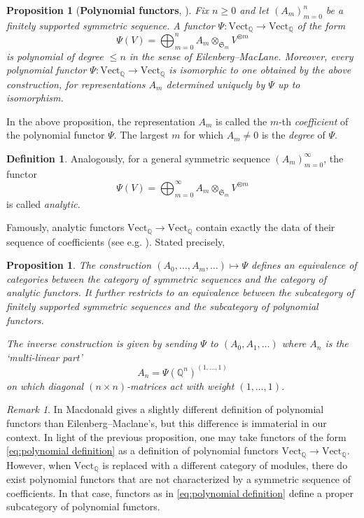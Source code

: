 \documentclass[12pt]{article}
\newcommand{\Q}{\mathbb{Q}}
\newcommand{\SymGroup}[1][n]{\mathfrak{S}_{#1}}
\newcommand{\Vect}[1]{\textrm{Vect}_{#1}}
\DeclareMathOperator{\GL}{GL}
\theoremstyle{plain}
\newtheorem{prop}[thm]{Proposition}
\theoremstyle{definition}
\newtheorem{defi}[thm]{Definition}
\theoremstyle{remark}
\newtheorem{rmk}[thm]{Remark}
\begin{document}
\begin{prop}[\textbf{Polynomial functors}{, \cite[Appendix I.A]{MacDonald}}]\label{prop:polynomiality-Qmod}
    Fix $n\geq 0$ and let $(A_m)_{m=0}^n$ be a finitely supported symmetric sequence. A functor $\Psi\colon \Vect{\Q}\to\Vect{\Q}$ of the form 
    \begin{equation} \label{eq:polynomial definition}
        \Psi(V) = \bigoplus_{m=0}^n{A_m\otimes_{\SymGroup[m]}{V^{\otimes m}}}
    \end{equation}
    is \emph{polynomial of degree $\leq n$} in the sense of Eilenberg--MacLane. Moreover, every polynomial functor $\Psi: \Vect{\Q}\to \Vect{\Q}$ is isomorphic to one obtained by the above construction, for representations $A_m$ determined uniquely by $\Psi$ up to isomorphism.
\end{prop}
 In the above proposition, the representation $A_m$ is called the $m$-th \emph{coefficient} of the polynomial functor $\Psi$. The largest $m$ for which $A_m \neq 0$ is the \emph{degree} of $\Psi$.
 \begin{defi}
    Analogously, for a general symmetric sequence $(A_m)_{m= 0}^{\infty}$, the functor
    \[
        \Psi(V) = \bigoplus_{m= 0}^\infty{A_m\otimes_{\SymGroup[m]}{V^{\otimes m}}}
    \]
    is called \emph{analytic}.
\end{defi}

Famously, analytic functors $\Vect{\Q}\to\Vect{\Q}$ contain exactly the data of their sequence of coefficients (see e.g. \cite[Appendix I.A]{MacDonald}). Stated precisely,

\begin{prop}\label{prop:equiv symmetric sequence analytic functors}
    {The construction $(A_0,\ldots, A_m,\ldots)\mapsto \Psi$ defines an equivalence of categories between the category of symmetric sequences and the category of analytic functors. It further restricts to  an equivalence between the subcategory of finitely supported symmetric sequences and the subcategory of polynomial functors.}

The inverse construction is given by sending $\Psi$ to $(A_0,A_1,\ldots)$ where $A_n$ is the `multi-linear part'
\[
A_n = \Psi( \Q^n  ) ^{(1,\ldots,1)}
\]
on which diagonal $(n\times n)$-matrices %
act with weight $(1,\ldots,1)$.
\end{prop}

\begin{rmk}
    In \cite{MacDonald} Macdonald gives a slightly different definition of polynomial functors than Eilenberg--Maclane's, but this difference is immaterial in our context.
    In light of the previous proposition, one may take functors of the form \eqref{eq:polynomial definition} as a definition of polynomial functors $\Vect{\Q}\to\Vect{\Q}$. However, when $\Vect{\Q}$ is replaced with a different category of modules, there do exist polynomial functors that are not characterized by a symmetric sequence of coefficients. In that case, functors as in \eqref{eq:polynomial definition} define a proper subcategory of polynomial functors.
\end{rmk}
\end{document}
